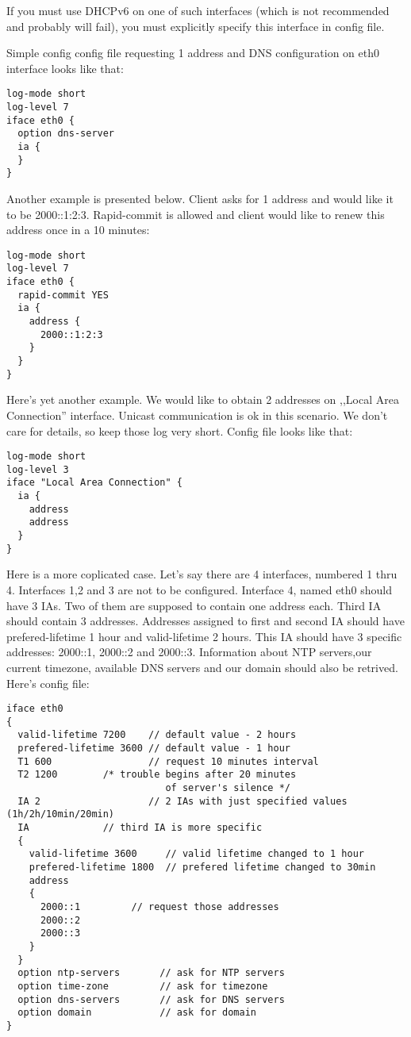 If you must use DHCPv6 on one of such interfaces (which is not
recommended and probably will fail), you must explicitly specify this
interface in config file.

Simple config config file requesting 1 address and DNS configuration
on eth0 interface looks like that:
\begin{verbatim}
log-mode short
log-level 7
iface eth0 {
  option dns-server
  ia {
  }
}
\end{verbatim}

Another example is presented below. Client asks for 1 address and
would like it to be 2000::1:2:3. Rapid-commit is allowed and client
would like to renew this address once in a 10 minutes:

\begin{verbatim}
log-mode short
log-level 7
iface eth0 {
  rapid-commit YES
  ia {
    address { 
      2000::1:2:3
    }
  }
}
\end{verbatim}

Here's yet another example. We would like to obtain 2 addresses on
,,Local Area Connection'' interface. Unicast communication is ok in
this scenario. We don't care for details, so keep those log very
short. Config file looks like that:
\begin{verbatim}
log-mode short
log-level 3
iface "Local Area Connection" {
  ia {
    address
    address
  }
}
\end{verbatim}

Here is a more coplicated case. Let's say there are 4 interfaces,
numbered 1 thru 4. Interfaces 1,2 and 3 are not to be
configured. Interface 4, named eth0 should have 3 IAs. Two of them are
supposed to contain one address each. Third IA should contain 3
addresses. Addresses assigned to first and second IA should have
prefered-lifetime 1 hour and valid-lifetime 2 hours. This IA should
have 3 specific addresses: 2000::1, 2000::2 and 2000::3. Information
about NTP servers,our current timezone, available DNS servers and our
domain should also be retrived. Here's config file:

\begin{verbatim}
iface eth0
{
  valid-lifetime 7200    // default value - 2 hours
  prefered-lifetime 3600 // default value - 1 hour
  T1 600                 // request 10 minutes interval
  T2 1200		 /* trouble begins after 20 minutes
                            of server's silence */
  IA 2                   // 2 IAs with just specified values (1h/2h/10min/20min)
  IA			 // third IA is more specific
  {
    valid-lifetime 3600   	// valid lifetime changed to 1 hour
    prefered-lifetime 1800	// prefered lifetime changed to 30min
    address
    {			  
      2000::1		  // request those addresses
      2000::2             
      2000::3
    }
  }
  option ntp-servers       // ask for NTP servers
  option time-zone         // ask for timezone
  option dns-servers       // ask for DNS servers
  option domain            // ask for domain
}
\end{verbatim}

